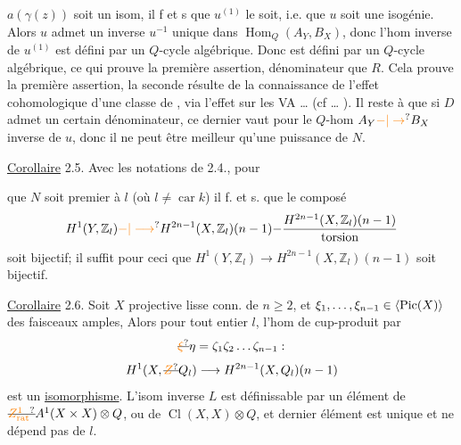 $a(\gamma(z))$ soit un isom, il f et s que $u^{(1)}$ le soit, i.e. que $u$ soit une isogénie. Alors $u$ admet un inverse $u^{-1}$ unique dans $\operatorname{Hom}_Q(A_Y,B_X)$,  donc l'hom inverse de $u^{(1)}$ est défini par un $Q$-cycle algébrique.  Donc  est défini par un $Q$-cycle algébrique, ce qui prouve la première assertion,  dénominateur que $R$. Cela prouve la première assertion, la seconde résulte de la connaissance de l'effet cohomologique d'une classe de  , via l'effet sur les VA \ldots{} (cf \ldots{} ). Il reste à  que si $D$ admet un certain dénominateur, ce dernier vaut pour le  $Q$-hom $A_Y\unsure{\mathbin{-}|\to}B_X$ inverse de $u$, donc il  ne peut être meilleur qu'une puissance de  $N$.

\uline{Corollaire} 2.5. Avec les notations de 2.4., pour

que  $N$ soit premier à $l$ (où $l\ne\operatorname{car}k$) il f. et s. que le composé
\[
H^1(Y,\mathbb Z_l)\unsure{\mathord{-}|\longrightarrow} H^{2n-1}(X,\mathbb Z_l)(n-1)\mathord{-}
\frac{H^{2n-1}(X,\mathbb Z_l)(n-1)}{\text{torsion}}
\]
soit  bijectif;  il suffit pour ceci que $H^1(Y,\mathbb Z_l)\to H^{2n-1}(X,\mathbb Z_l)(n-1)$ soit bijectif.

\uline{Corollaire} 2.6. Soit $X$ projective lisse conn. de  $n\geq2$, et $\xi_1,\ldots,\xi_{n-1}\in\inserted{\operatorname{Pic}(X)}$   des faisceaux amples,  Alors pour tout entier $l$, l'hom de cup-produit par
\[
\deleted{\unsure{\xi}}\eta=\zeta_1\zeta_2\ldots\zeta_{n-1}:
\]
\[
H^1(X,\deleted{\unsure{Z}}Q_l)\longrightarrow H^{2n-1}(X,Q_l)(n-1)
\]
est un \uline{isomorphisme}. L'isom inverse $L$ est définissable par un élément de $\deleted{\unsure{Z^1_{\mathrm{rat}}}}A^1(X\times X)\otimes Q$,  ou  de $\operatorname{Cl}(X,X)\otimes Q$, et   dernier élément est unique et ne dépend pas de $l$.

